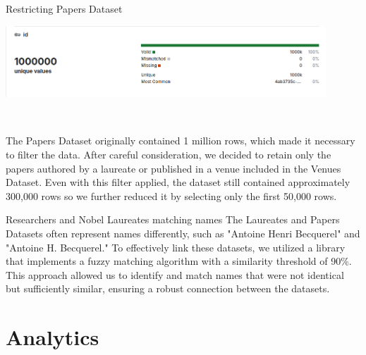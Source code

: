 \documentclass[aspectratio=169,xcolor=dvipsnames]{beamer}
\begin{document}
\begin{frame}{Restricting Papers Dataset}
	\centering
	\begin{minipage}{0.8\textwidth}
		\centering
		\includegraphics[width=0.9\textwidth]{huge_dataset.png}
	\end{minipage} \\
	\vspace{1em}
	\begin{minipage}{0.8\textwidth}
		The Papers Dataset originally contained 1 million rows, which made it necessary to filter the data.
		After careful consideration, we decided to retain only the papers authored by a laureate or published
		in a venue included in the Venues Dataset.
		Even with this filter applied, the dataset still contained approximately 300,000 rows so we further
		reduced it by selecting only the first 50,000 rows.
	\end{minipage}
\end{frame}

\begin{frame}{Researchers and Nobel Laureates matching names}
	The Laureates and Papers Datasets often represent names differently, such as "Antoine Henri Becquerel"
	and "Antoine H. Becquerel." To effectively link these datasets, we utilized a library that implements a
	fuzzy matching algorithm with a similarity threshold of 90\%. This approach allowed us to identify and
	match names that were not identical but sufficiently similar, ensuring a robust connection between the
	datasets.
\end{frame}

\section{Analytics}
\end{document}
